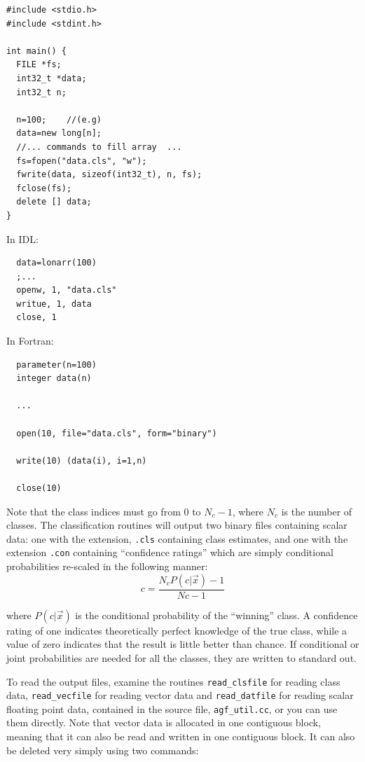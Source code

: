 \documentclass[12pt]{article}
\begin{document}
\begin{verbatim}
#include <stdio.h>
#include <stdint.h>

int main() {
  FILE *fs;
  int32_t *data;
  int32_t n;

  n=100;	//(e.g)
  data=new long[n];
  //... commands to fill array  ...
  fs=fopen("data.cls", "w");
  fwrite(data, sizeof(int32_t), n, fs);
  fclose(fs);
  delete [] data;
}
\end{verbatim}

In IDL:

\begin{verbatim}
  data=lonarr(100)
  ;...
  openw, 1, "data.cls"
  writue, 1, data
  close, 1
\end{verbatim}

In Fortran:

\begin{verbatim}
  parameter(n=100)
  integer data(n)

  ...

  open(10, file="data.cls", form="binary")
 
  write(10) (data(i), i=1,n)

  close(10)
\end{verbatim}

Note that the class indices must go from 0 to $N_c-1$, where $N_c$ is the number of classes.  The classification routines will output two binary files containing scalar data:  one with the extension, \verb".cls" containing class estimates, and one with the extension \verb".con" containing ``confidence ratings'' which are simply conditional probabilities re-scaled in the following manner:
\begin{equation}
c = \frac{N_c P(c | \vec x) - 1}{Nc - 1}
\end{equation}

where $P(c | \vec x)$ is the conditional probability of the ``winning'' class.  A confidence rating of one indicates theoretically perfect knowledge of the true class, while a value of zero indicates that the result is little better than chance.  If conditional or joint probabilities are needed for all the classes, they are written to standard out.

To read the output files, examine the routines \verb"read_clsfile" for reading class data, \verb"read_vecfile" for reading vector data and \verb"read_datfile" for reading scalar floating point data, contained in the source file, \verb"agf_util.cc", or you can use them directly.  Note that vector data is allocated in one contiguous block, meaning that it can also be read and written in one contiguous block.  It can also be deleted very simply using two commands:
\end{document}
